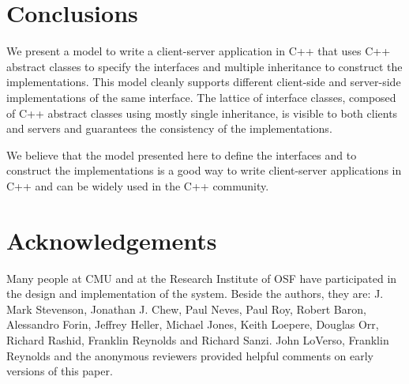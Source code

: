 \section{Conclusions}

We present a model to write a client-server application in C++ that
uses C++ abstract classes to specify the interfaces and multiple
inheritance to construct the implementations. This model cleanly
supports different client-side and server-side implementations of the
same interface. The lattice of interface classes, composed of C++
abstract classes using mostly single inheritance, is
visible to both clients and servers and guarantees the consistency of
the implementations.

We believe that the model presented here to define the interfaces and
to construct the implementations is a good way to write
client-server applications in C++ and can be widely used in the C++
community. 

\section{Acknowledgements}

Many people at CMU and at the Research Institute of OSF have
participated in the design and implementation of the system. Beside
the authors, they are: J. Mark Stevenson, Jonathan J. Chew, Paul
Neves, Paul Roy, Robert Baron, Alessandro Forin, Jeffrey Heller, 
Michael Jones, Keith Loepere, Douglas Orr, Richard Rashid, Franklin
Reynolds and Richard Sanzi. John LoVerso, Franklin Reynolds and the
anonymous reviewers provided helpful comments on early versions of
this paper.

{\small


}


